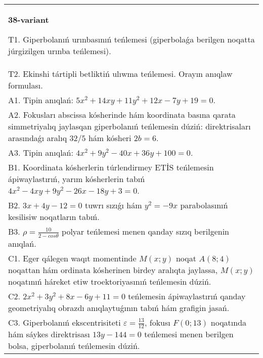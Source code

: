 \documentclass{article}
\begin{document}
\begin{tabular}{m{17cm}}
\textbf{38-variant}
\newline

T1. Giperbolanıń urınbasınıń teńlemesi (giperbolaǵa berilgen noqatta júrgizilgen urınba teńlemesi).\\

T2. Ekinshi tártipli betliktiń ulıwma teńlemesi. Orayın anıqlaw formulası.\\

A1. Tipin anıqlań: $5 x^{2}+14 xy+11 y^{2}+12 x-7 y+19=0$.\\

A2. Fokusları abscissa kósherinde hám koordinata basına qarata simmetriyalıq jaylasqan giperbolanıń teńlemesin dúziń: direktrisaları arasındaǵı aralıq $32/5$ hám kósheri $2 b=6$.\\

A3. Tipin anıqlań: $4 x^2+9 y^2-40 x+36 y+100=0$.\\

B1. Koordinata kósherlerin túrlendirmey ETİS teńlemesin ápiwaylastırıń, yarım kósherlerin tabıń $4x^{2} - 4xy + 9y^{2} - 26x - 18y + 3 = 0$.\\

B2. $3x + 4y - 12 = 0$ tuwrı sızıǵı hám $y^{2} = - 9x$ parabolasınıń kesilisiw noqatların tabıń.  \\

B3. $\rho = \frac{10}{2 - cos\theta}$ polyar teńlemesi menen qanday sızıq berilgenin anıqlań.  \\

C1. Eger qálegen waqıt momentinde $M(x;y)$ noqat $A(8;4)$ noqattan hám ordinata kósherinen birdey aralıqta jaylassa, $M(x;y)$ noqatınıń háreket etiw troektoriyasınıń teńlemesin dúziń.  \\

C2. $2x^{2} + 3y^{2} + 8x - 6y + 11 = 0$ teńlemesin ápiwaylastırıń qanday geometriyalıq obrazdı anıqlaytuǵının tabıń hám grafigin jasań.\\

C3. Giperbolanıń ekscentrisiteti $\varepsilon = \frac{13}{12}$, fokusı $F(0;13)$ noqatında hám sáykes direktrisası $13y - 144 = 0$ teńlemesi menen berilgen bolsa, giperbolanıń teńlemesin dúziń.  \\

\end{tabular}
\vspace{1cm}
\end{document}
